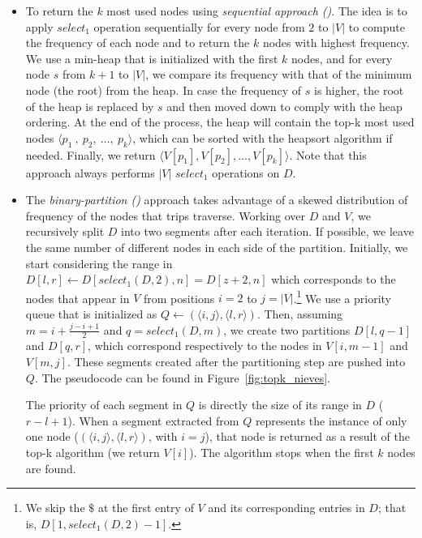 \begin{itemize}[leftmargin=3mm]
	\begin{itemize}
	\item To return the $k$ most used nodes using {\em sequential approach (\Stkseq)}. The idea is
	to apply  $select_1$ operation sequentially for every node from $2$ to $|V|$ to compute the 
	frequency of each node and to return the $k$ nodes with highest frequency.
	We use a min-heap that is initialized with
	the first $k$ nodes, and for every node $s$ from $k+1$ to $|V|$, 
	we compare its frequency with that of the minimum node (the root) from
	the heap. In case the frequency of $s$ is higher, the root of the heap is replaced by $s$ and
	then moved down to comply with the heap ordering. At the end of the process, the heap
	will contain the top-k most used nodes $\langle p_1\:,\:p_2,\:\dots,\:p_k \rangle$, which can be 
	sorted with the heapsort algorithm if needed. Finally, we return $\langle V[p_1],V[p_2],\dots,V[p_k]\rangle$.
	Note that this  approach always performs $|V|$ $select_1$ operations on $D$.

	\item The {\em binary-partition (\Stkbin)} approach takes advantage of a skewed 
	distribution of frequency of the nodes that trips traverse.  Working over $D$ and $V$, we 
	recursively split $D$  into two segments after each iteration. 
	If possible, we leave the same number of different nodes in each side of the partition. 
	Initially, we start considering the range in $D[l,r] \leftarrow D[select_1(D,2),n]=D[z+2,n]$ 
	which corresponds to the nodes that appear in 
	$V$ from positions $i=2$ to $j=|V|$.\footnote{We skip the $\$$ at the first entry of $V$ and its corresponding 
	entries in $D$; that is, $D[1,select_1(D,2)-1]$.}
	We use a priority queue that is initialized as $Q \leftarrow (\langle i,j\rangle, \langle l,r\rangle)$.
	Then, assuming $m=i + \frac{j-i+1}{2}$ and $q=select_1(D,m)$, we create two partitions 
	$D[l, q-1]$ and  $D[q, r]$, which correspond respectively to the nodes in $V[i,m-1]$ and $V[m, j]$.
	These  segments created after the partitioning step are
	pushed into  $Q$. %
	The pseudocode can be found in  Figure~\ref{fig:topk_nieves}.

	The priority of each segment in $Q$ is
	directly the size of its range in $D$ ($r-l+1$). 
	When a segment extracted from $Q$ represents the instance of only one node ($(\langle i,j\rangle, \langle l,r\rangle)$, with $i=j$),
	that node is returned as a result of the top-k algorithm (we return $V[i]$). The algorithm stops when the first $k$
	nodes are found.


\end{itemize}
\end{itemize}
